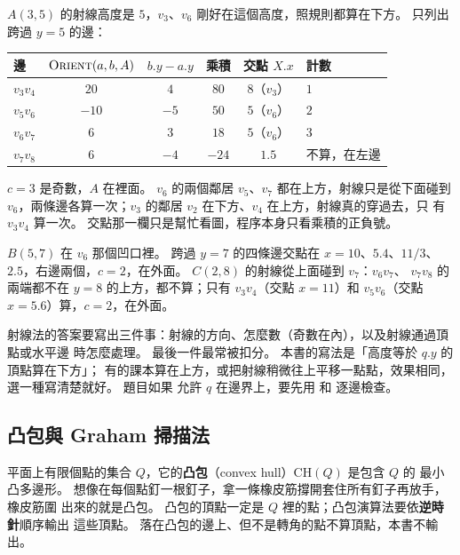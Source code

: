 $A(3, 5)$ 的射線高度是 $5$，$v_3$、$v_6$ 剛好在這個高度，照規則都算在下方。 只列出
跨過 $y = 5$ 的邊：

\begin{center}
\begin{tabular}{lccccl}
\toprule
邊 & $\proc{Orient}(a, b, A)$ & $b.y - a.y$ & 乘積 & 交點 $X.x$ & 計數 \\
\midrule
$v_3 v_4$ & $20$ & $4$ & $80$ & $8$（$v_3$） & $1$ \\
$v_5 v_6$ & $-10$ & $-5$ & $50$ & $5$（$v_6$） & $2$ \\
$v_6 v_7$ & $6$ & $3$ & $18$ & $5$（$v_6$） & $3$ \\
$v_7 v_8$ & $6$ & $-4$ & $-24$ & $1.5$ & 不算，在左邊 \\
\bottomrule
\end{tabular}
\end{center}

$c = 3$ 是奇數，$A$ 在裡面。 $v_6$ 的兩個鄰居 $v_5$、$v_7$ 都在上方，射線只是從下面碰到
$v_6$，兩條邊各算一次；$v_3$ 的鄰居 $v_2$ 在下方、$v_4$ 在上方，射線真的穿過去，只
有 $v_3 v_4$ 算一次。 交點那一欄只是幫忙看圖，程序本身只看乘積的正負號。

$B(5, 7)$ 在 $v_6$ 那個凹口裡。 跨過 $y = 7$ 的四條邊交點在 $x = 10$、$5.4$、$11/3$、
$2.5$，右邊兩個，$c = 2$，在外面。 $C(2, 8)$ 的射線從上面碰到 $v_7$：$v_6 v_7$、
$v_7 v_8$ 的兩端都不在 $y = 8$ 的上方，都不算；只有 $v_3 v_4$（交點 $x = 11$）和
$v_5 v_6$（交點 $x = 5.6$）算，$c = 2$，在外面。

\begin{examnote}
射線法的答案要寫出三件事：射線的方向、怎麼數（奇數在內），以及射線通過頂點或水平邊
時怎麼處理。 最後一件最常被扣分。 本書的寫法是「高度等於 $q.y$ 的頂點算在下方」；
有的課本算在上方，或把射線稍微往上平移一點點，效果相同，選一種寫清楚就好。 題目如果
允許 $q$ 在邊界上，要先用  和  逐邊檢查。
\end{examnote}

\subsection{凸包與 Graham 掃描法}
\label{sec:dc-graham}

平面上有限個點的集合 $Q$，它的\textbf{凸包}（convex hull）$\mathrm{CH}(Q)$ 是包含 $Q$ 的
最小凸多邊形。 想像在每個點釘一根釘子，拿一條橡皮筋撐開套住所有釘子再放手，橡皮筋圍
出來的就是凸包。 凸包的頂點一定是 $Q$ 裡的點；凸包演算法要依\textbf{逆時針}順序輸出
這些頂點。 落在凸包的邊上、但不是轉角的點不算頂點，本書不輸出。

